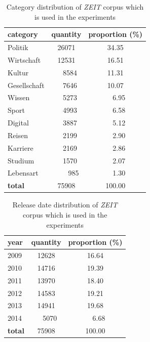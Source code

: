 \begin{table}[!ht]
\centering
\begin{tabularx}{0.7\textwidth}{Xcc}
\hline
\textbf{category} &   \textbf{quantity} &   \textbf{proportion (\%)} \\
\hline
Politik      &      26071 &            34.35 \\
Wirtschaft   &      12531 &            16.51 \\
Kultur       &       ~~8584 &            11.31 \\
Gesellschaft &       ~~7646 &            10.07 \\
Wissen       &       ~~5273 &             ~~6.95 \\
Sport        &       ~~4993 &             ~~6.58 \\
Digital      &       ~~3887 &             ~~5.12 \\
Reisen       &       ~~2199 &             ~~2.90 \\
Karriere     &       ~~2169 &             ~~2.86 \\
Studium      &       ~~1570 &             ~~2.07 \\
Lebensart    &       ~~~~985 &             ~~1.30 \\
\hline
\textbf{total}        &      75908 &           100.00 \\
\hline
\end{tabularx}
\caption{Category distribution of \textit{ZEIT} corpus which is used in the experiments}
\label{tab:cate_dist_new}
\end{table}

\begin{table}[!ht]
\centering
\begin{tabularx}{0.7\textwidth}{Xcc}
\hline
\textbf{year} &   \textbf{quantity} &   \textbf{proportion (\%)} \\
\hline
2009 & 12628 &            16.64 \\
2010 & 14716 &            19.39 \\
2011 & 13970 &            18.40 \\
2012 & 14583 &            19.21 \\
2013 & 14941 &            19.68 \\
2014 &  ~~5070 &            ~~6.68 \\
\hline
\textbf{total} & 75908 &           100.00 \\
\hline
\end{tabularx}
\caption{Release date distribution of \textit{ZEIT} corpus which is used in the experiments}
\label{tab:release_dist_new}
\end{table}

